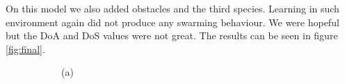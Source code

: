 \documentclass[9pt]{pnas-new}
\begin{document}
	On this model we also added obstacles and the third species. Learning in such environment again did not produce any swarming behaviour. We were hopeful but the DoA and DoS values were not great.
	The results can be seen in figure \ref{fig:final}.
	
	\begin{figure}[ht]
		\centering
		\begin{subfigure}{0.22\textwidth}
			\centering
			\vspace{0.5em}
			\centering (a)
		\end{subfigure}
		\hfill
		\begin{subfigure}{0.22\textwidth}
			\centering

\end{subfigure}
\end{figure}
\end{document}
